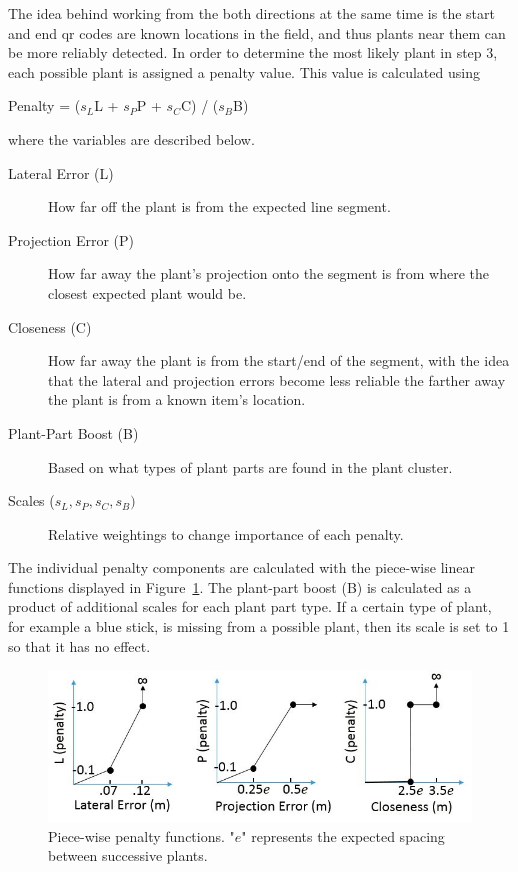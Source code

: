 The idea behind working from the both directions at the same time is the start and end \ac{qr} codes are known locations in the field, and thus plants near them can be more reliably detected.  In order to determine the most likely plant in step 3, each possible plant is assigned a penalty value.  This value is calculated using

\begin{center}
Penalty = ($s_L$L + $s_P$P + $s_C$C) / ($s_B$B)
\end{center}
where the variables are described below.

\begin{description}
\item[Lateral Error (L)] How far off the plant is from the expected line segment.
\item[Projection Error (P)] How far away the plant's projection onto the segment is from where the closest expected plant would be.
\item[Closeness (C)] How far away the plant is from the start/end of the segment, with the idea that the lateral and projection errors become less reliable the farther away the plant is from a known item's location.
\item[Plant-Part Boost (B)] Based on what types of plant parts are found in the plant cluster.
\item[Scales ($s_L,s_P,s_C,s_B)$] Relative weightings to change importance of each penalty.
\end{description}

The individual penalty components are calculated with the piece-wise linear functions displayed in Figure~\ref{figure:piecewise_penalties}.  The plant-part boost (B) is calculated as a product of additional scales for each plant part type.  If a certain type of plant, for example a blue stick, is missing from a possible plant, then its scale is set to 1 so that it has no effect.  

\begin{figure}
	\centering
    \includegraphics[width=5.5in]{figures/piece_wise.jpg}
    \caption[Penalty functions]{Piece-wise penalty functions. "$e$" represents the expected spacing between successive plants.}
    \label{figure:piecewise_penalties}
\end{figure}

